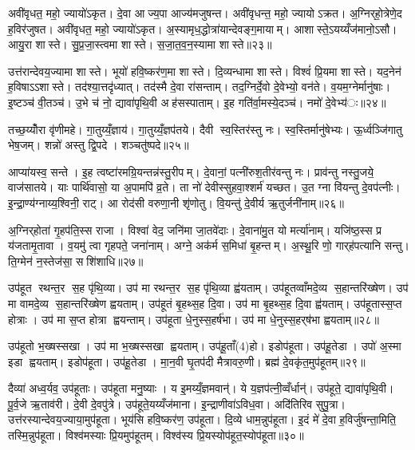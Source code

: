 अवी॑वृधत॒ महो॒ ज्यायो॑ऽकृत। दे॒वा आज्य॒पा आज्य॑मजुषन्त। अवी॑वृधन्त॒ महो॒ ज्यायोऽक्रत। अ॒ग्निर्‌हो॒त्रेणे॒द ह॒विर॑जुषत। अवी॑वृधत॒ महो॒ ज्यायो॑ऽकृत। अ॒स्यामृध॒द्धोत्रा॑यान्देवङ्ग॒मायाम्। आशास्ते॒ऽयय्यँज॑मानो॒ऽसौ। आयु॒रा शास्ते। सु॒प्र॒जा॒स्त्वमा शास्ते। स॒जा॒त॒व॒न॒स्यामा शास्ते॥२३॥

उत्त॑रान्देवय॒ज्यामा शास्ते। भूयो॑ हवि॒ष्कर॑ण॒मा शास्ते। दि॒व्यन्धामा शास्ते। विश्वं॑ प्रि॒यमा शास्ते। यद॒नेन॑ ह॒विषाऽऽशास्ते। तद॑श्या॒त्तदृ॑ध्यात्। तद॑स्मै दे॒वा रा॑सन्ताम्। तद॒ग्निर्दे॒वो दे॒वेभ्यो॒ वन॑ते। व॒यम॒ग्नेर्मानु॑षाः। इ॒ष्टञ्च॑ वी॒तञ्च॑। उ॒भे च॑ नो॒ द्यावा॑पृथि॒वी अह॑सस्पाताम्। इ॒ह गति॑र्वा॒मस्ये॒दञ्च॑। नमो॑ दे॒वेभ्य॑ः॥२४॥


तच्छ॒य्योँरा वृ॑णीमहे। गा॒तुय्यँ॒ज्ञाय॑। गा॒तुय्यँ॒ज्ञप॑तये। दैवी स्व॒स्तिर॑स्तु नः। स्व॒स्तिर्मानु॑षेभ्यः। ऊ॒र्ध्वञ्जि॑गातु भेष॒जम्। शन्नो॑ अस्तु द्वि॒पदे। शञ्चतु॑ष्पदे॥२५॥


आप्या॑यस्व॒ सन्ते। इ॒ह त्वष्टा॑रमग्रि॒यन्तन्न॑स्तु॒रीपम्। दे॒वानां॒ पत्नी॑रुश॒तीर॑वन्तु नः। प्राव॑न्तु नस्तु॒जये॒ वाज॑सातये। याः पार्थि॑वासो॒ या अ॒पामपि॑ व्र॒ते। ता नो॑ देवीस्सुहवा॒श्शर्म॑ यच्छत। उ॒त ग्ना वि॑यन्तु दे॒वप॑त्नीः। इ॒न्द्रा॒ण्य॑ग्नाय्य॒श्विनी॒ राट्। आ रोद॑सी वरुणा॒नी शृ॑णोतु। वि॒यन्तु॑ दे॒वीर्य ऋ॒तुर्जनी॑नाम्॥२६॥

अ॒ग्निर्‌होता॑ गृ॒हप॑ति॒स्स राजा। विश्वा॑ वेद॒ जनि॑मा जा॒तवे॑दाः। दे॒वाना॑मु॒त यो मर्त्या॑नाम्। यजि॑ष्ठ॒स्स प्र य॑जतामृ॒तावा। व॒यमु॑ त्वा गृहपते॒ जना॑नाम्। अग्ने॒ अक॑र्म स॒मिधा॑ बृ॒हन्तम्। अ॒स्थू॒रि णो॒ गार्‌ह॑पत्यानि सन्तु। ति॒ग्मेन॑ न॒स्तेज॑सा॒ सशि॑शाधि॥२७॥


उप॑हूत रथन्त॒र स॒ह पृ॑थि॒व्या। उप॑ मा रथन्त॒र स॒ह पृ॑थि॒व्या ह्व॑यताम्। उप॑हूतव्वाँमदे॒व्य स॒हान्तरि॑ख्षेण। उप॑ मा वामदे॒व्य स॒हान्तरि॑ख्षेण ह्वयताम्। उप॑हूतं बृ॒हथ्स॒ह दि॒वा। उप॑ मा बृ॒हथ्स॒ह दि॒वा ह्व॑यताम्। उप॑हूतास्स॒प्त होत्राः। उप॑ मा स॒प्त होत्रा ह्वयन्ताम्। उप॑हूता धे॒नुस्स॒हर्ष॑भा। उप॑ मा धे॒नुस्स॒हर्‌ष॑भा ह्वयताम्॥२८॥

उप॑हूतो भ॒ख्षस्सखा। उप॑ मा भ॒ख्षस्सखा ह्वयताम्। उप॑हू॒ताँ(4)हो। इडोप॑हूता। उप॑हू॒तेडा। उपो॑ अ॒स्मा इडा ह्वयताम्। इडोप॑हूता। उप॑हू॒तेडा। मा॒न॒वी घृ॒तप॑दी मैत्रावरु॒णी। ब्रह्म॑ दे॒वकृ॑त॒मुप॑हूतम्॥२९॥

दैव्या॑ अध्व॒र्यव॒ उप॑हूताः। उप॑हूता मनु॒ष्याः। य इ॒मय्यँ॒ज्ञमवान्॑। ये य॒ज्ञप॑त्नी॒व्वँर्धान्॑। उप॑हूते॒ द्यावा॑पृथि॒वी। पू॒र्व॒जे ऋ॒ताव॑री। दे॒वी दे॒वपु॑त्रे। उप॑हूते॒यय्यँज॑माना। इ॒न्द्राणीवा॑ऽविध॒वा। अदि॑तिरिव सुपु॒त्रा। उत्त॑रस्यान्देवय॒ज्याया॒मुप॑हूता। भूय॑सि हवि॒ष्कर॑ण॒ उप॑हूता। दि॒व्ये धाम॒न्नुप॑हूता। इ॒दं मे॑ दे॒वा ह॒विर्जु॑षन्ता॒मिति॒ तस्मि॒न्नुप॑हूता। विश्व॑मस्याः प्रि॒यमुप॑हूतम्। विश्व॑स्य प्रि॒यस्योप॑हूत॒स्योप॑हूता॥३०॥

